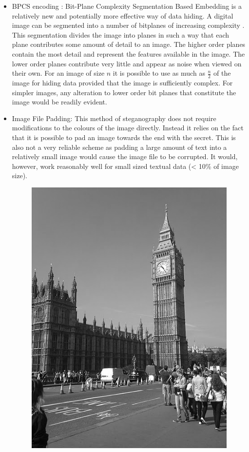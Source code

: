 \begin{itemize}
\item BPCS encoding : Bit-Plane Complexity Segmentation Based Embedding is a relatively new and potentially more effective way of data hiding.  A digital image can be segmented into a number of bitplanes of increasing complexity \cite{kawaguchi1998concept}. This segmentation divides the image into planes in such a way that each plane contributes some amount of detail to an image. The higher order planes contain the most detail and represent the features available in the image. The lower order planes contribute very little and appear as noise when viewed on their own.  For an image of size $n$ it is possible to use as much as $\frac{n}{2}$ of the image for hiding data provided that the image is sufficiently complex. For simpler images, any alteration to lower order bit planes that constitute the image would be readily evident.
\item Image File Padding: This method of steganography does not require modifications to the colours of the image directly. Instead it relies on the fact that it is possible to pad an image towards the end with the secret. This is also not a very reliable scheme as padding a large amount of text into a relatively small image would cause the image file to be corrupted. It would, however, work reasonably well for small sized textual data (< 10\% of image size).
\begin{figure}[h!]
\includegraphics[scale=0.3]{embedded1}

\end{figure}
\end{itemize}
